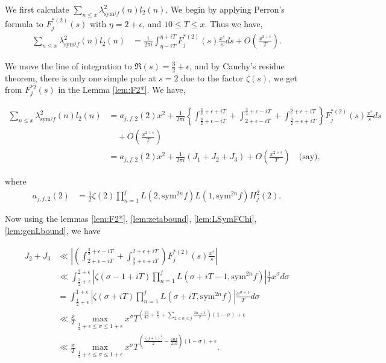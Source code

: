 \documentclass[10pt]{amsart}
\begin{document}
We first calculate $\sum_{n\leq x}\lambda_{\mathrm{sym}^{j}f}^2(n)l_2(n)$. We begin by applying Perron's formula to $F_{j}^{*(2)}(s)$ with $\eta=2+\epsilon$, and $10\leq T\leq x$. Thus we have,
\begin{align*}
\sum_{n\leq x}\lambda_{\mathrm{sym}^{j}f}^2(n)l_2(n)
&= \frac{1}{2\pi i}\int_{\eta-iT}^{\eta+iT}F_{j}^{*(2)}(s)\frac{x^{s}}{s}ds + O\left(\frac{x^{2+\epsilon}}{T}\right).
\end{align*}

We move the line of integration to $\Re(s)=\frac{3}{2}+\epsilon$, and by Cauchy's residue theorem, there is only one simple pole at $s=2$ due to the factor $\zeta(s)$, we get from $F^{*2}_{j}(s)$ in the Lemma \ref{lem:F2*}. We have,

\begin{align}
    \sum_{n\leq x}\lambda_{\mathrm{sym}^{j}f}^2(n)l_2(n) & = a_{j,f,2}(2)x^2+\frac{1}{2\pi i}\left\{\int_{\frac{3}{2}+\epsilon-iT}^{\frac{3}{2}+\epsilon+iT}+\int_{2+\epsilon-iT}^{\frac{3}{2}+\epsilon-iT}+\int_{\frac{3}{2}+\epsilon+iT}^{2+\epsilon+iT}\right\}F_{j}^{*(2)}(s)\frac{x^{s}}{s}ds \\
    &\quad + O\left(\frac{x^{2+\epsilon}}{T}\right) \\
    &= a_{j,f,2}(2)x^2+\frac{1}{2\pi i}(J_{1}+J_{2}+J_{3})+O\left(\frac{x^{2+\epsilon}}{T}\right) \quad \text{(say)} ,
\end{align}

where \begin{align} \label{ajf2}
    a_{j,f,2}(2) &= \frac{1}{2}\zeta(2)\prod_{n=1}^{j}L(2,\mathrm{sym}^{2n}f)L(1,\mathrm{sym}^{2n}f)H_j^2(2).
\end{align}

Now using the lemmas \ref{lem:F2*}, \ref{lem:zetabound}, \ref{lem:LSymFChi}, \ref{lem:genLbound}, we have

\begin{align}
    J_2+J_3 &\ll \left| \left( \int_{2+\epsilon-iT}^{\frac{3}{2}+\epsilon-iT}+\int_{\frac{3}{2}+\epsilon+iT}^{2+\epsilon+iT} \right)F_j^{*(2)}(s)\frac{x^s}{s}\right| \\
    &\ll  \int_{\frac{3}{2}+\epsilon}^{2+\epsilon} \left|\zeta(\sigma-1+iT)\prod_{n=1}^{j}L(\sigma+iT-1, \mathrm{sym}^{2n} f)\right|\frac{1}{T}x^\sigma d\sigma \\
    &= \int_{\frac{1}{2}+\epsilon}^{1+\epsilon} \left|\zeta(\sigma+iT)\prod_{n=1}^{j}L(\sigma +iT, \mathrm{sym}^{2n} f)\right|\frac{x^{\sigma+1}}{T}d\sigma \\
    &\ll \frac{x}{T}\max_{\frac{1}{2}+\epsilon \leq \sigma \leq 1+\epsilon} x^\sigma T^{(\frac{13}{42}+\frac{6}{5}+\sum_{2\leq n\leq j}\frac{2n+1}{2})(1-\sigma)+\epsilon}\\
    &\ll \frac{x}{T}\max_{\frac{1}{2}+\epsilon \leq \sigma \leq 1+\epsilon}x^\sigma T^{(\frac{(j+1)^2}{2}-\frac{103}{210})(1-\sigma)+\epsilon}.
\end{align}
\end{document}
